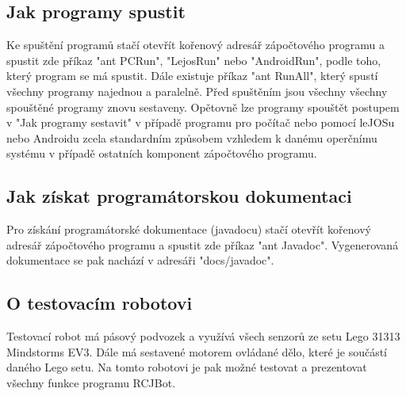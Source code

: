 \documentclass[12pt, ngerman]{article}
\begin{document}
\subsection{Jak programy spustit}
Ke spuštění programů stačí otevřít kořenový adresář zápočtového programu a spustit zde příkaz "ant PCRun", "LejosRun" nebo "AndroidRun", podle toho, který program se má spustit. Dále existuje příkaz "ant RunAll", který spustí všechny programy najednou a paralelně. Před spuštěním jsou všechny všechny spouštěné programy znovu sestaveny. Opětovně lze programy spouštět postupem v "Jak programy sestavit" v případě programu pro počítač nebo pomocí leJOSu nebo Androidu zcela standardním způsobem vzhledem k danému operčnímu systému v případě ostatních komponent zápočtového programu.

\subsection{Jak získat programátorskou dokumentaci}
Pro získání programátorské dokumentace (javadocu) stačí otevřít kořenový adresář zápočtového programu a spustit zde příkaz "ant Javadoc". Vygenerovaná dokumentace se pak nachází v adresáři "docs/javadoc".

\subsection{O testovacím robotovi}
Testovací robot má pásový podvozek a využívá všech senzorů ze setu Lego 31313 Mindstorms EV3. Dále má sestavené motorem ovládané dělo, které je součástí daného Lego setu. Na tomto robotovi je pak možné testovat a prezentovat všechny funkce programu RCJBot.
\end{document}
